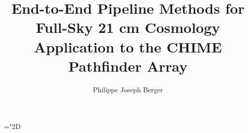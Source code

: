 \author{Philippe Joseph Berger}
\title{End-to-End Pipeline Methods for Full-Sky 21 cm Cosmology \\ Application to the CHIME Pathfinder Array}

\setcounter{tocdepth}{3}

\renewcommand{\arraystretch}{1.25}

\usepackage{subcaption}
\usepackage{caption}

\newcommand{\url}[1]{#1}
\usepackage[]{hyperref}
\usepackage{xcolor}

\mathchardef\myphen="2D

\newcommand{\ndat}{\hspace*{\fill}---\hspace*{\fill}}

\usepackage{microtype}
\usepackage{booktabs}
\usepackage{amsmath}
\usepackage{amssymb}
\usepackage[square,nonamebreak,numbers]{natbib}
\usepackage{aas_macros}
\usepackage{booktabs}
\usepackage{lmodern}
\usepackage{graphicx}
\usepackage{cancel}
\usepackage{float}


\newcommand{\RNum}[1]{\uppercase\expandafter{\romannumeral #1\relax}}

\newcommand{\RN}[1]{%
  \textup{\uppercase\expandafter{\romannumeral#1}}%
}

\newcommand{\change}[1]{{\color{red}#1}}

\newcommand{\nh}{\hat{\mathbf{n}}}

\usepackage{calligra}
\newcommand{\scripty}[1]{\ensuremath{\mathcalligra{#1}}}

\graphicspath{{./images/}}